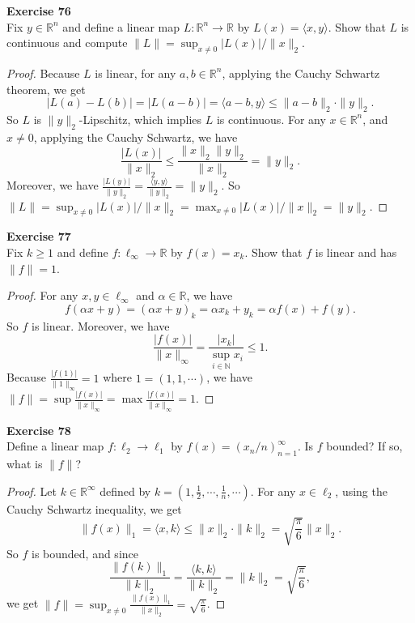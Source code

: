 \documentclass[12pt, a4paper]{article}
\theoremstyle{plain}
\newcommand{\N}{\mathbb{N}}
\newcommand{\R}{\mathbb{R}}
\newenvironment{exercise}[2][Exercise]
    { \begin{mdframed}[backgroundcolor=gray!20] \textbf{#1 #2} \\}
    {  \end{mdframed}}
\begin{document}
\begin{exercise}{76}
Fix $y\in\R^n$ and define a linear map $L:\R^n\rightarrow \R$ by $L(x)=\langle{x,y}\rangle$. Show that $L$ is continuous and compute $\|L\|=\sup_{x\neq 0}|L(x)|/\|x\|_2$.
\end{exercise}
	\begin{proof}
	Because $L$ is linear, for any $a,b\in \R^n$, applying the Cauchy Schwartz theorem, we get
	\[
	|L(a)-L(b)|=|L(a-b)|=\langle{a-b,y}\rangle \leq \|a-b\|_2\cdot\|y\|_2.
	\]
	So $L$ is $\|y\|_2$-Lipschitz, which implies $L$ is continuous. For any $x\in \R^n$, and $x\neq 0$, applying the Cauchy Schwartz, we have
	\[
	\frac{|L(x)|}{\|x\|_2}\leq \frac{\|x\|_2\|y\|_2}{\|x\|_2}=\|y\|_2.
	\]
	Moreover, we have $\frac{|L(y)|}{\|y\|_2}=\frac{\langle{y,y}\rangle}{\|y\|_2}=\|y\|_2$. So $\|L\|=\sup_{x\neq 0}|L(x)|/\|x\|_2=\max_{x\neq 0}|L(x)|/\|x\|_2=\|y\|_2$.
	\end{proof}
	
\begin{exercise}{77}
Fix $k\geq 1$ and define $f:\ell_\infty\rightarrow\R$ by $f(x)=x_k$. Show that $f$ is linear and has $\|f\|=1$.
\end{exercise}
	\begin{proof}
	For any $x,y\in\ell_\infty$ and $\alpha\in\R$, we have
	\[
	f(\alpha x+y)=(\alpha x+y)_k=\alpha x_k+y_k=\alpha f(x)+f(y).
	\]
	So $f$ is linear. Moreover, we have
	\[
	\frac{|f(x)|}{\|x\|_\infty}=\frac{|x_k|}{\sup_{i\in\N}{x_i}}\leq 1.
	\]
	Because $\frac{|f(1)|}{\|1\|_\infty}=1$ where $1=(1,1,\cdots)$, we have $\|f\|=\sup \frac{|f(x)|}{\|x\|_\infty}=\max \frac{|f(x)|}{\|x\|_\infty}=1$.
	\end{proof}

\begin{exercise}{78}
Define a linear map $f:\ell_2\rightarrow\ell_1$ by $f(x)=(x_n/n)_{n=1}^\infty$. Is $f$ bounded? If so, what is $\|f\|$?
\end{exercise}
	\begin{proof}
	Let $k\in \R^\infty$ defined by $k=(1,\frac{1}{2},\cdots,\frac{1}{n},\cdots)$. For any $x\in\ell_2$, using the Cauchy Schwartz inequality, we get
	\[
	\|f(x)\|_1=\langle{x,k}\rangle\leq \|x\|_2\cdot \|k\|_2=\sqrt{\frac{\pi}{6}}\|x\|_2.
	\]
	So $f$ is bounded, and since 
	\[
	\frac{\|f(k)\|_1}{\|k\|_2}=\frac{\langle{k,k}\rangle}{\|k\|_2}=\|k\|_2=\sqrt{\frac{\pi}{6}},
	\]
	we get $\|f\|=\sup_{x\neq 0}\frac{\|f(x)\|_1}{\|x\|_2}=\sqrt{\frac{\pi}{6}}$.
	\end{proof}

\pagebreak
\end{document}
